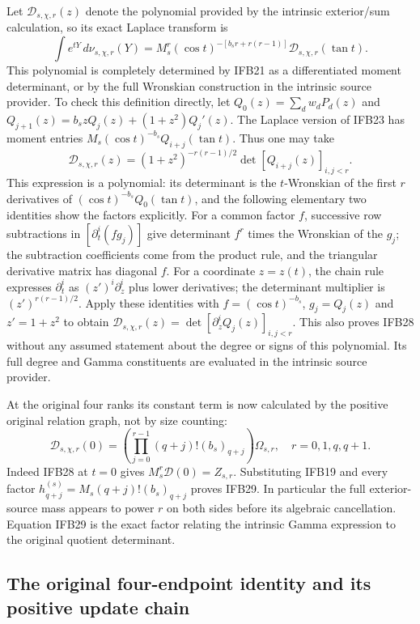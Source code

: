 Let $\mathcal D_{s,\chi,r}(z)$ denote the polynomial provided by
the intrinsic exterior/sum calculation, so its exact Laplace
transform is
\[
 \int e^{tY}\,d\nu_{s,\chi,r}(Y)
 =M_s^r(\cos t)^{-[b_sr+r(r-1)]}
             \mathcal D_{s,\chi,r}(\tan t).
 \tag{IFB28}
\]
This polynomial is completely determined by IFB21 as a differentiated
moment determinant, or by the full Wronskian construction in the
intrinsic source provider. To check this definition directly, let
$Q_0(z)=\sum_dw_dP_d(z)$ and
$Q_{j+1}(z)=b_szQ_j(z)+(1+z^2)Q_j'(z)$.
The Laplace version of IFB23 has moment entries
$M_s(\cos t)^{-b_s}Q_{i+j}(\tan t)$.
Thus one may take
\[
 \mathcal D_{s,\chi,r}(z)
 =(1+z^2)^{-r(r-1)/2}\det[Q_{i+j}(z)]_{i,j<r}.
\]
This expression is a polynomial: its determinant is the
$t$-Wronskian of the first $r$ derivatives of
$(\cos t)^{-b_s}Q_0(\tan t)$, and the following elementary two
identities show the factors explicitly.
For a common factor $f$, successive row subtractions in
$[\partial_t^i(fg_j)]$ give determinant $f^r$
times the Wronskian of the $g_j$; the subtraction coefficients come
from the product rule, and the triangular derivative matrix has
diagonal $f$. For a coordinate $z=z(t)$, the chain rule expresses
$\partial_t^i$ as $(z')^i\partial_z^i$ plus lower derivatives;
the determinant multiplier is $(z')^{r(r-1)/2}$.
Apply these identities with $f=(\cos t)^{-b_s}$,
$g_j=Q_j(z)$ and $z'=1+z^2$ to obtain
$\mathcal D_{s,\chi,r}(z)=\det[\partial_z^iQ_j(z)]_{i,j<r}$.
This also proves IFB28 without any assumed statement about the
degree or signs of this polynomial. Its full degree and Gamma
constituents are evaluated in the intrinsic source provider.

At the original four ranks its constant term is now calculated by
the positive original relation graph, not by size counting:
\[
 \boxed{\displaystyle
 \mathcal D_{s,\chi,r}(0)
 =\left(\prod_{j=0}^{r-1}(q+j)!(b_s)_{q+j}\right)
                       \Omega_{s,r},\quad r=0,1,q,q+1.}
 \tag{IFB29}
\]
Indeed IFB28 at $t=0$ gives $M_s^r\mathcal D(0)=Z_{s,r}$.
Substituting IFB19 and every factor
$h_{q+j}^{(s)}=M_s(q+j)!(b_s)_{q+j}$ proves IFB29. In particular
the full exterior-source mass appears to power $r$ on both sides
before its algebraic cancellation. Equation IFB29 is the exact
factor relating the intrinsic Gamma expression to the original
quotient determinant.

\subsection{The original four-endpoint identity and its positive update chain}

